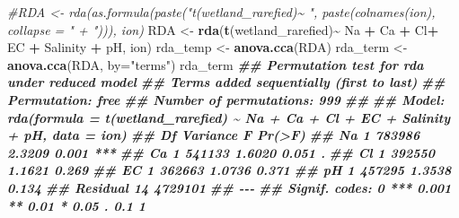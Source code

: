 \documentclass[
]{article}
\newenvironment{Shaded}{\begin{snugshade}}{\end{snugshade}}
\newcommand{\AttributeTok}[1]{\textcolor[rgb]{0.13,0.29,0.53}{#1}}
\newcommand{\CommentTok}[1]{\textcolor[rgb]{0.56,0.35,0.01}{\textit{#1}}}
\newcommand{\DocumentationTok}[1]{\textcolor[rgb]{0.56,0.35,0.01}{\textbf{\textit{#1}}}}
\newcommand{\FunctionTok}[1]{\textcolor[rgb]{0.13,0.29,0.53}{\textbf{#1}}}
\newcommand{\NormalTok}[1]{#1}
\newcommand{\OtherTok}[1]{\textcolor[rgb]{0.56,0.35,0.01}{#1}}
\newcommand{\SpecialCharTok}[1]{\textcolor[rgb]{0.81,0.36,0.00}{\textbf{#1}}}
\newcommand{\StringTok}[1]{\textcolor[rgb]{0.31,0.60,0.02}{#1}}
\begin{document}
\begin{Shaded}
\begin{Highlighting}[]
\CommentTok{\#RDA \textless{}{-} rda(as.formula(paste("t(wetland\_rarefied)\textasciitilde{} ", paste(colnames(ion), collapse = " + "))), ion)}
\NormalTok{RDA }\OtherTok{\textless{}{-}} \FunctionTok{rda}\NormalTok{(}\FunctionTok{t}\NormalTok{(wetland\_rarefied)}\SpecialCharTok{\textasciitilde{}}\NormalTok{ Na }\SpecialCharTok{+}\NormalTok{ Ca }\SpecialCharTok{+}\NormalTok{ Cl}\SpecialCharTok{+}\NormalTok{ EC }\SpecialCharTok{+}\NormalTok{ Salinity }\SpecialCharTok{+}\NormalTok{ pH, ion)}
\NormalTok{rda\_temp }\OtherTok{\textless{}{-}} \FunctionTok{anova.cca}\NormalTok{(RDA)}
\NormalTok{rda\_term }\OtherTok{\textless{}{-}} \FunctionTok{anova.cca}\NormalTok{(RDA, }\AttributeTok{by=}\StringTok{"terms"}\NormalTok{)}
\NormalTok{rda\_term}
\DocumentationTok{\#\# Permutation test for rda under reduced model}
\DocumentationTok{\#\# Terms added sequentially (first to last)}
\DocumentationTok{\#\# Permutation: free}
\DocumentationTok{\#\# Number of permutations: 999}
\DocumentationTok{\#\# }
\DocumentationTok{\#\# Model: rda(formula = t(wetland\_rarefied) \textasciitilde{} Na + Ca + Cl + EC + Salinity + pH, data = ion)}
\DocumentationTok{\#\#          Df Variance      F Pr(\textgreater{}F)    }
\DocumentationTok{\#\# Na        1   783986 2.3209  0.001 ***}
\DocumentationTok{\#\# Ca        1   541133 1.6020  0.051 .  }
\DocumentationTok{\#\# Cl        1   392550 1.1621  0.269    }
\DocumentationTok{\#\# EC        1   362663 1.0736  0.371    }
\DocumentationTok{\#\# pH        1   457295 1.3538  0.134    }
\DocumentationTok{\#\# Residual 14  4729101                  }
\DocumentationTok{\#\# {-}{-}{-}}
\DocumentationTok{\#\# Signif. codes:  0 \textquotesingle{}***\textquotesingle{} 0.001 \textquotesingle{}**\textquotesingle{} 0.01 \textquotesingle{}*\textquotesingle{} 0.05 \textquotesingle{}.\textquotesingle{} 0.1 \textquotesingle{} \textquotesingle{} 1}
\end{Highlighting}
\end{Shaded}
\end{document}
